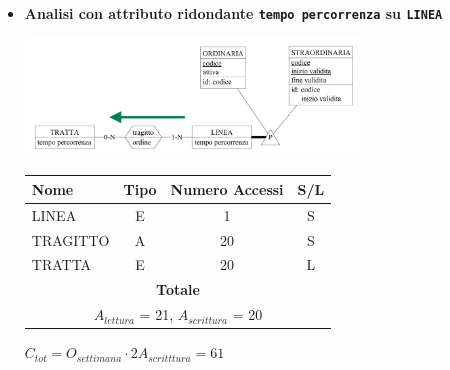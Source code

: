\documentclass[12pt,a4paper]{report}
\begin{document}
\begin{enumerate}[label=\textbf{\arabic*)}]
	 \begin{itemize}
    	\item \textbf{Analisi con attributo ridondante \texttt{tempo percorrenza} su \texttt{LINEA}}
	\begin{center}
	\includegraphics[width=0.7\textwidth]{InserimentoLineaRid}
	\end{center}
	\begin{table}[H]
	\centering
	\begin{tabular}{|l|c|c|c|}
	\hline
	Nome & Tipo & Numero Accessi & S/L \\
	\hline
	LINEA & E & 1 & S \\
	\hline
	TRAGITTO & A & 20 & S \\
	\hline
	TRATTA & E & 20 & L \\
	\hline
	    \multicolumn{4}{c}{\textbf{Totale}} \\
	    \multicolumn{4}{c}{${A_{lettura}}$ = 21, ${A_{scrittura}}$ = 20} \\
	    \hline
	    \end{tabular}
	    \end{table}
	    \begin{center}
	    ${C_{tot} = {O_{settimana}}\cdot{2A_{scritttura}}= 61}$
	    \end{center}


\end{itemize}
\end{enumerate}
\end{document}
